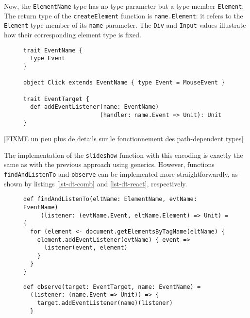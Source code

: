 \documentclass{llncs}
\newcommand{\jscode}[1]{\lstinline[language=JavaScript]|#1|}
\newcommand{\scalacode}[1]{\lstinline[language=Scala]|#1|}
\begin{document}
Now, the \scalacode{ElementName} type has no type parameter but a type member \scalacode{Element}. The return type of the \scalacode{createElement} function is \scalacode{name.Element}: it refers to the \scalacode{Element} type member of its \scalacode{name} parameter. The \scalacode{Div} and \scalacode{Input} values illustrate how their corresponding element type is fixed.

\begin{figure}
\begin{lstlisting}[label=lst-dt-events,caption={Encoding of \jscode{addEventListener} using path-dependent types}]
trait EventName {
  type Event
}

object Click extends EventName { type Event = MouseEvent }

trait EventTarget {
  def addEventListener(name: EventName)
                      (handler: name.Event => Unit): Unit
}
\end{lstlisting}
\end{figure}

[FIXME un peu plus de details sur le fonctionnement des path-dependent types]

The implementation of the \scalacode{slideshow} function with this encoding is exactly the same as with the previous approach using generics. However, functions \jscode{findAndListenTo} and \jscode{observe} can be implemented more straightforwardly, as shown by listings \ref{lst-dt-comb} and \ref{lst-dt-react}, respectively.

\begin{figure}
\begin{lstlisting}[label=lst-dt-comb,caption={Combination of \scalacode{getElementsByTagName} and \scalacode{addEventListener} using path-dependent types}]
def findAndListenTo(eltName: ElementName, evtName: EventName)
     (listener: (evtName.Event, eltName.Element) => Unit) = {
  for (element <- document.getElementsByTagName(eltName) {
    element.addEventListener(evtName) { event =>
      listener(event, element)
    }
  }
}
\end{lstlisting}
\end{figure}

\begin{figure}
\begin{lstlisting}[label=lst-dt-react,caption={Partial application of \scalacode{addEventListener} using path-dependent types}]
def observe(target: EventTarget, name: EventName) =
  (listener: (name.Event => Unit)) => {
    target.addEventListener(name)(listener)
  }
\end{lstlisting}
\end{figure}
\end{document}
